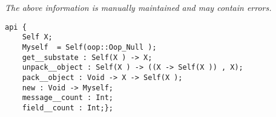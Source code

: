 \label{api:Root\_Object2}

{\tiny \it The above information is manually maintained and may contain errors.}
\begin{verbatim}
api {
    Self X;
    Myself  = Self(oop::Oop_Null );
    get__substate : Self(X ) -> X;
    unpack__object : Self(X ) -> ((X -> Self(X )) , X);
    pack__object : Void -> X -> Self(X );
    new : Void -> Myself;
    message__count : Int;
    field__count : Int;};
\end{verbatim}
